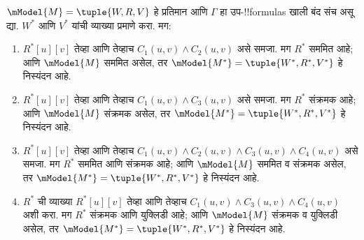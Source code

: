 \documentclass[../../../include/open-logic-section]{subfiles}
\begin{document}
\begin{thm}
  $\mModel{M} =\tuple{W,R,V}$ हे प्रतिमान आणि
  $\Gamma$ हा उप-!!{formula}s खाली बंद संच असू द्या.
  $W^*$ आणि $V^*$ यांची व्याख्या
   प्रमाणे करा. मग:
  \begin{enumerate}
  \item $R^*[u][v]$ तेव्हा आणि तेव्हाच $C_1(u, v) \land
    C_2(u,v)$ असे समजा. मग $R^*$ सममित आहे; आणि
    $\mModel{M}$ सममित असेल, तर $\mModel{M^*} =
    \tuple{W^*,R^*,V^*}$ हे निस्यंदन आहे.
  \item $R^*[u][v]$ तेव्हा आणि तेव्हाच $C_1(u, v)
    \land C_3(u,v)$ असे समजा. मग $R^*$ संक्रमक आहे;
    आणि $\mModel{M}$ संक्रमक असेल, तर
    $\mModel{M^*}=\tuple{W^*,R^*,V^*}$ हे निस्यंदन आहे.
  \item $R^*[u][v]$ तेव्हा आणि तेव्हाच $C_1(u, v) \land C_2(u,v)
    \land C_3(u,v) \land C_4(u,v)$ असे समजा. मग $R^*$
    सममित आणि संक्रमक आहे; आणि $\mModel{M}$ सममित
    व संक्रमक असेल, तर $\mModel{M^*}=\tuple{W^*,R^*,V^*}$
    हे निस्यंदन आहे.
  \item $R^*$ ची व्याख्या $R^*[u][v]$ तेव्हा आणि तेव्हाच $C_1(u,
    v) \land C_3(u,v) \land C_4(u,v)$ अशी करा. मग $R^*$
    संक्रमक आणि युक्लिडी आहे; आणि $\mModel{M}$ संक्रमक
    व युक्लिडी असेल, तर $\mModel{M^*}=\tuple{W^*,R^*,V^*}$
    हे निस्यंदन आहे.
  \end{enumerate}
\end{thm}
\end{document}
